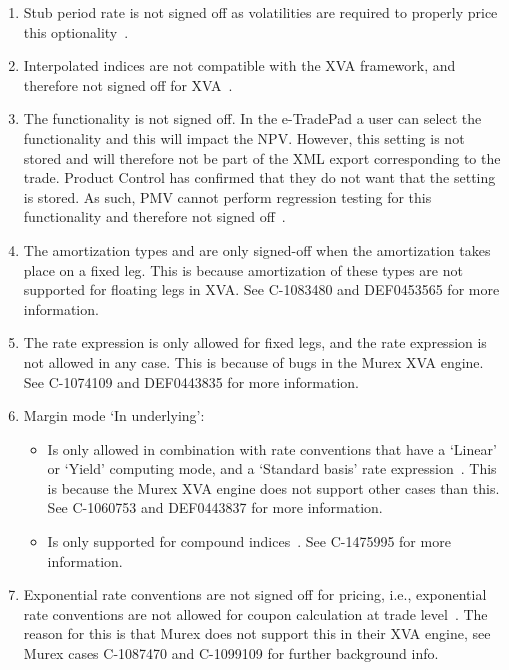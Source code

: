 \documentclass[]{pmv_report} %
\begin{document}
\begin{enumerate}
\begin{enumerate}
    See Murex case C-1158502 for further background info.
  \end{enumerate}
  \item Stub period rate  is not signed off as volatilities are required to properly price this optionality~\cite{MxSettings.IRS,MxSettings.IRSGenerator}.
  \item Interpolated indices are not compatible with the XVA framework, and therefore not signed off for XVA~\cite{MxSettings.IRS,MxSettings.IRSGenerator}.
  \item The  functionality is not signed off.
  In the e-TradePad a user can select the  functionality and this will impact the NPV.
  However, this  setting is not stored and will therefore not be part of the XML export corresponding to the trade.
  Product Control has confirmed that they do not want that the        setting is stored.
  As such, PMV cannot perform regression testing for this functionality and therefore not signed off~\cite{MxSettings.IRS}.
  \item The amortization types  and  are only signed-off when the amortization takes place on a fixed leg.
  This is because amortization of these types are not supported for floating legs in XVA.
  See C-1083480 and DEF0453565 for more information.
  \item The rate expression  is only allowed for fixed legs, and the rate expression  is not allowed in any case.
  This is because of bugs in the Murex XVA engine.
  See C-1074109 and DEF0443835 for more information.
  \item Margin mode `In underlying':
  \begin{itemize}
    \item Is only allowed in combination with rate conventions that have a `Linear' or `Yield' computing mode, and a `Standard basis' rate expression~\cite{MxSettings.IRSGenerator}.
    This is because the Murex XVA engine does not support other cases than this.
    See C-1060753 and DEF0443837 for more information.
    \item Is only supported for compound indices~\cite{MxSettings.IRSGenerator}.
    See C-1475995 for more information.
  \end{itemize}
  \item Exponential rate conventions are not signed off for pricing, i.e., exponential rate conventions are not allowed for coupon calculation at trade level~\cite{MxSettings.IRS,MxSettings.IRSGenerator}.
  The reason for this is that Murex does not support this in their XVA engine, see Murex cases C-1087470 and C-1099109 for further background info.
\end{enumerate}
\end{document}
